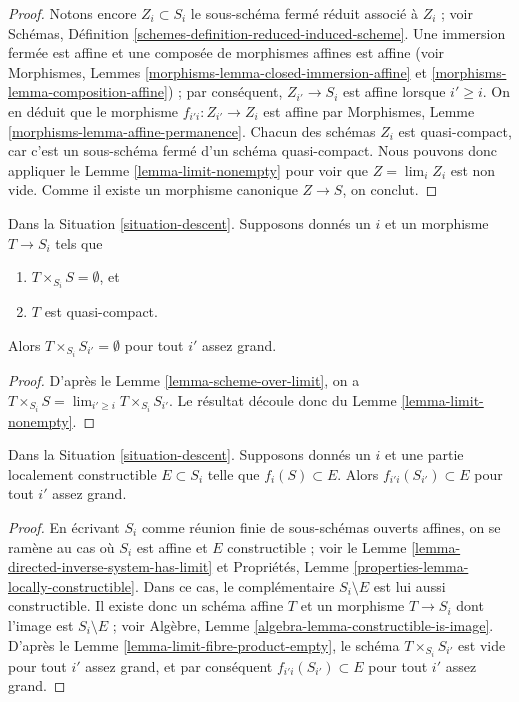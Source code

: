 \begin{proof}
Notons encore $Z_i \subset S_i$ le sous-schéma fermé réduit associé à
$Z_i$ ; voir Schémas,
Définition \ref{schemes-definition-reduced-induced-scheme}. Une immersion
fermée est affine et une composée de morphismes affines est affine (voir
Morphismes, Lemmes \ref{morphisms-lemma-closed-immersion-affine} et
\ref{morphisms-lemma-composition-affine}) ; par conséquent,
$Z_{i'} \to S_i$ est affine lorsque $i' \geq i$. On en déduit que le morphisme
$f_{i'i} : Z_{i'} \to Z_i$ est affine par
Morphismes, Lemme \ref{morphisms-lemma-affine-permanence}. Chacun des schémas $Z_i$ est
quasi-compact, car c'est un sous-schéma fermé d'un schéma quasi-compact.
Nous pouvons donc appliquer le Lemme \ref{lemma-limit-nonempty} pour voir
que $Z = \lim_i Z_i$ est non vide. Comme il existe un morphisme canonique
$Z \to S$, on conclut.
\end{proof}

\begin{lemma}
\label{lemma-limit-fibre-product-empty}
Dans la Situation \ref{situation-descent}. Supposons donnés un $i$ et un
morphisme $T \to S_i$ tels que
\begin{enumerate}
\item $T \times_{S_i} S = \emptyset$, et
\item $T$ est quasi-compact.
\end{enumerate}
Alors $T \times_{S_i} S_{i'} = \emptyset$ pour tout $i'$ assez grand.
\end{lemma}

\begin{proof}
D'après le Lemme \ref{lemma-scheme-over-limit}, on a
$T \times_{S_i} S = \lim_{i' \geq i} T \times_{S_i} S_{i'}$. Le résultat
découle donc du Lemme \ref{lemma-limit-nonempty}.
\end{proof}

\begin{lemma}
\label{lemma-limit-contained-in-constructible}
Dans la Situation \ref{situation-descent}. Supposons donnés un $i$ et une
partie localement constructible $E \subset S_i$ telle que
$f_i(S) \subset E$. Alors $f_{i'i}(S_{i'}) \subset E$ pour tout $i'$ assez
grand.
\end{lemma}

\begin{proof}
En écrivant $S_i$ comme réunion finie de sous-schémas ouverts affines, on
se ramène au cas où $S_i$ est affine et $E$ constructible ; voir le
Lemme \ref{lemma-directed-inverse-system-has-limit} et Propriétés,
Lemme \ref{properties-lemma-locally-constructible}. Dans ce cas, le
complémentaire $S_i \setminus E$ est lui aussi constructible. Il existe donc
un schéma affine $T$ et un morphisme $T \to S_i$ dont l'image est
$S_i \setminus E$ ; voir Algèbre,
Lemme \ref{algebra-lemma-constructible-is-image}. D'après le
Lemme \ref{lemma-limit-fibre-product-empty}, le schéma
$T \times_{S_i} S_{i'}$ est vide pour tout $i'$ assez grand, et par
conséquent $f_{i'i}(S_{i'}) \subset E$ pour tout $i'$ assez grand.
\end{proof}

